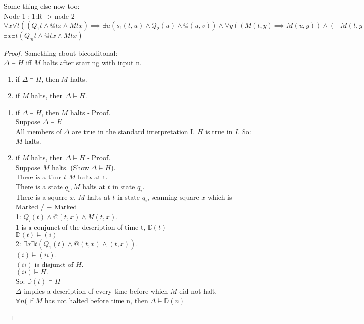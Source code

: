 Some thing else now too:\\
Node 1 : 1:R -> node 2 \\
$\forall x \forall t ((Q_1 t \wedge @tx \wedge Mtx ) \implies \exists u ( s_1 (t , u) \wedge Q_2(u) \wedge @ (u,v)) \wedge \forall y ((M(t,y) \implies M(u,y)) \wedge (-M(t,y) \implies - M(u,y)))))$ \\
$\exists x \exists t ( Q_mt \wedge @tx \wedge Mtx)$\\


\begin{proof}
Something about biconditonal:\\
$\Delta \vDash H$ iff $M$ halts after starting with input n.
\begin{enumerate}
\item if $\Delta \vDash H$, then $M$ halts.
\item if $M$ halts, then $\Delta \vDash H$.
\end{enumerate}
\begin{enumerate}
\item if $\Delta \vDash H$, then $M$ halts - Proof. \\
Suppose $\Delta \vDash H$ \\
All members of $\Delta$ are true in the standard interpretation I.
$H$ is true in $I$.
So: $M$ halts.
\item if $M$ halts, then $\Delta \vDash H$ - Proof. \\
Suppose $M$ halts. (Show $\Delta \vDash H$). \\
There is a time \underline{$t$} $M$ halts at t. \\
There is a state $q_i, M$ halts at $t$ in state $q_i$. \\
There is a square $x$, $M$ halts at $t$ in state $q_i$, scanning square $x$ which is Marked / $-$ Marked \\
1: $Q_i(t) \wedge @(t,x) \wedge M(t,x)$. \\
1 is a conjunct of the description of time t, $\mathbb{D}(t)$ \\
$\mathbb{D}(t) \vDash (i)$ \\

2: $\exists x \exists t (Q_1(t) \wedge @ (t,x) \wedge (t,x))$. \\

$(i) \vDash (ii)$. \\
$(ii)$ is disjunct of $H$. \\
$(ii) \vDash H.$ \\
So: $\mathbb{D}(t) \vDash H$. \\


$\Delta$ implies a description of every time before which $M$ did not halt. \\
$\forall n$( if $M$ has not halted before time n, then $\Delta \vDash \mathbb{D}(n)$ \\
\end{enumerate}
\end{proof}


